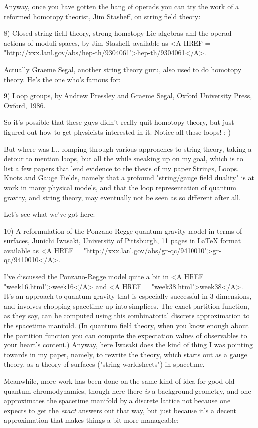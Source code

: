 Anyway, once you have gotten the hang of operads you can try the work of
a reformed homotopy theorist, Jim Stasheff, on string field theory:

8) Closed string field theory, strong homotopy Lie algebras and the
operad actions of moduli spaces, by Jim Stasheff, available as
<A HREF = "http://xxx.lanl.gov/abs/hep-th/9304061">hep-th/9304061</A>.  

Actually Graeme Segal, another string theory guru, also used to do
homotopy theory.  He's the one who's famous for:

9) Loop groups, by Andrew Pressley and Graeme Segal, Oxford University
Press, Oxford, 1986. 

So it's possible that these guys didn't really quit homotopy theory,
but just figured out how to get physicists interested in it.  Notice all
those loops!  :-)

But where was I... romping through various approaches to string theory,
taking a detour to mention loops, but all the while sneaking up on my
goal, which is to list a few papers that lend evidence to the thesis of
my paper Strings, Loops, Knots and Gauge Fields, namely that a profound
"string/gauge field duality" is at work in many physical models, and
that the loop representation of quantum gravity, and string theory, may
eventually not be seen as so different after all.

Let's see what we've got here:

10) A reformulation of the Ponzano-Regge quantum gravity model in terms of
surfaces, Junichi Iwasaki, University of Pittsburgh, 11 pages in LaTeX format
available as <A HREF = "http://xxx.lanl.gov/abs/gr-qc/9410010">gr-qc/9410010</A>.  

I've discussed the Ponzano-Regge model quite a bit in <A HREF = "week16.html">week16</A> and <A HREF = "week38.html">week38</A>.
It's an approach to quantum gravity that is especially successful in 3
dimensions, and involves chopping spacetime up into simplices.  The
exact partition function, as they say, can be computed using this
combinatorial discrete approximation to the spacetime manifold.  (In
quantum field theory, when you know enough about the partition function
you can compute the expectation values of observables to your heart's
content.)  Anyway, here Iwasaki does the kind of thing I was pointing
towards in my paper, namely, to rewrite the theory, which starts out as
a gauge theory, as a theory of surfaces ("string worldsheets") in
spacetime.  
 
Meanwhile, more work has been done on the same kind of idea for 
good old quantum chromodynamics, though here there \emph{is} a background
geometry, and one approximates the spacetime manifold by a discrete
lattice not because one expects to get the \emph{exact} answers out that way,
but just because it's a decent approximation that makes things a bit
more manageable: 

